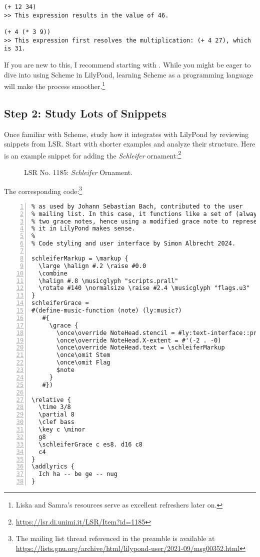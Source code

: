 \begin{Verbatim}
(+ 12 34)    
>> This expression results in the value of 46.

(+ 4 (* 3 9))
>> This expression first resolves the multiplication: (+ 4 27), which is 31.
\end{Verbatim}

If you are new to this, I recommend starting with \cite{LS0001}. While you might be eager to dive into using Scheme in LilyPond, learning Scheme as a programming language will make the process smoother.\footnote{Liska and Samra’s resources serve as excellent refreshers later on.}

\subsection{Step 2: Study Lots of Snippets}
Once familiar with Scheme, study how it integrates with LilyPond by reviewing snippets from LSR. Start with shorter examples and analyze their structure. Here is an example snippet for adding the \textit{Schleifer} ornament:\footnote{\url{https://lsr.di.unimi.it/LSR/Item?id=1185}}

	\begin{figure}[!htb]
	\centering
{}
	\caption{\label{fig:figure1} LSR No. 1185: \textit{Schleifer} Ornament.}
	\end{figure}

The corresponding code:\footnote{The mailing list thread referenced in the preamble is available at \url{https://lists.gnu.org/archive/html/lilypond-user/2021-09/msg00352.html}}
\begin{Verbatim}[numbers=left,xleftmargin=5mm]
% Implementation by Martin Straeten of the Schleifer ornament 
% as used by Johann Sebastian Bach, contributed to the user 
% mailing list. In this case, it functions like a set of (always?)
% two grace notes, hence using a modified grace note to represent 
% it in LilyPond makes sense.
%
% Code styling and user interface by Simon Albrecht 2024.

schleiferMarkup = \markup {
  \large \halign #.2 \raise #0.0
  \combine
  \halign #.8 \musicglyph "scripts.prall"
  \rotate #140 \normalsize \raise #2.4 \musicglyph "flags.u3"
}
schleiferGrace =
#(define-music-function (note) (ly:music?)
   #{
     \grace {
       \once\override NoteHead.stencil = #ly:text-interface::print
       \once\override NoteHead.X-extent = #'(-2 . -0)
       \once\override NoteHead.text = \schleiferMarkup
       \once\omit Stem
       \once\omit Flag
       $note
     }
   #})

\relative {
  \time 3/8
  \partial 8
  \clef bass
  \key c \minor
  g8
  \schleiferGrace c es8. d16 c8
  c4
}
\addlyrics {
  Ich ha -- be ge -- nug
}
\end{Verbatim}

